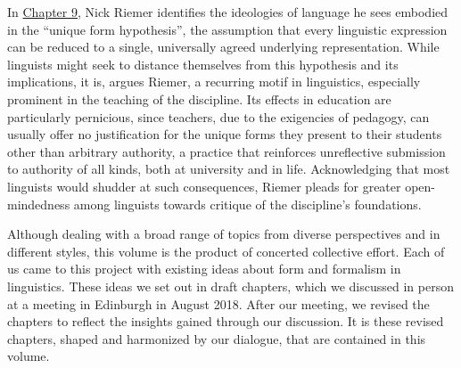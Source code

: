 \documentclass[output=paper]{langscibook}
\begin{document}
In \hyperref[chap:riemer]{Chapter 9}, Nick Riemer identifies the ideologies of language he sees embodied in the ``unique form hypothesis'', the assumption that every linguistic expression can be reduced to a single, universally agreed underlying representation. While linguists might seek to distance themselves from this hypothesis and its implications, it is, argues Riemer, a recurring motif in linguistics, especially prominent in the teaching of the discipline. Its effects in education are particularly pernicious, since teachers, due to the exigencies of pedagogy, can usually offer no justification for the unique forms they present to their students other than arbitrary authority, a practice that reinforces unreflective submission to authority of all kinds, both at university and in life. Acknowledging that most linguists would shudder at such consequences, Riemer pleads for greater open-mindedness among linguists towards critique of the discipline's foundations.

Although dealing with a broad range of topics from diverse perspectives and in different styles, this volume is the product of concerted collective effort. Each of us came to this project with existing ideas about form and formalism in linguistics. These ideas we set out in draft chapters, which we discussed in person at a meeting in Edinburgh in August 2018. After our meeting, we revised the chapters to reflect the insights gained through our discussion. It is these revised chapters, shaped and harmonized by our dialogue, that are contained in this volume. 

\sloppy
\printbibliography[heading=subbibliography]
\end{document}
